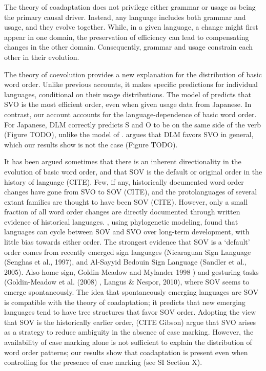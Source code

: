 \documentclass[11pt,a4paper]{article}
\begin{document}
The theory of coadaptation does not privilege either grammar or usage as being the primary causal driver.
Instead, any language includes both grammar and usage, and they evolve together.
While, in a given language, a change might first appear in one domain, the preservation of efficiency can lead to compensating changes in the other domain.
Consequently, grammar and usage constrain each other in their evolution.


The theory of coevolution provides a new explanation for the distribution of basic word order.
Unlike previous accounts, it makes specific predictions for individual languages, conditional on their usage distributions.
The model of \cite{maurits2010why} predicts that SVO is the most efficient order, even when given usage data from Japanese.
In contrast, our account accounts for the language-dependence of basic word order.
For Japanese, DLM correctly predicts S and O to be on the same side of the verb (Figure TODO), unlike the model of \cite{maurits2010why}.
\citet{ferrer-i-cancho-placement-2017} argues that DLM favors SVO in general, which our results show is not the case (Figure TODO).

It has been argued sometimes that there is an inherent directionality in the evolution of basic word order, and that SOV is the default or original order in the history of language (CITE).
Few, if any, historically documented word order changes have gone from SVO to SOV (CITE), and the protolanguages of several extant families are thought to have been SOV (CITE).
However, only a small fraction of all word order changes are directly documented through written evidence of historical languages.
\citep{maurits2014tracing}, using phylogenetic modeling, found that languages can cycle between SOV and SVO over long-term development, with little bias towards either order.
The strongest evidence that SOV is a `default' order comes from recently emerged sign languages (Nicaraguan Sign Language (Senghas et al., 1997), and Al-Sayyid Bedouin Sign Language (Sandler et al., 2005). Also home sign, Goldin-Meadow and Mylander 1998 ) and gesturing tasks (Goldin-Meadow et al. (2008) , Langus \& Nespor, 2010), where SOV seems to emerge spontaneously.
The idea that spontaneously emerging languages are SOV is compatible with the theory of coadaptation; it predicts that new emerging languages tend to have tree structures that favor SOV order.
Adopting the view that SOV is the historically earlier order, (CITE Gibson) argue that SVO arises as a strategy to reduce ambiguity in the absence of case marking.
However, the availability of case marking alone is not sufficient to explain the distribution of word order patterns; our results show that coadaptation is present even when controlling for the presence of case marking (see SI Section X).
\end{document}
